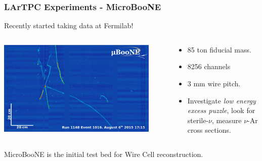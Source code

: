 \documentclass[xcolor=dvipsnames]{beamer}
\begin{document}
\begin{frame}
  \frametitle{LArTPC Experiments - MicroBooNE}

  \begin{center}
    Recently started taking data at Fermilab!    
  \end{center}

  \begin{columns}
    \begin{column}{0.5\textwidth}
      \begin{center}
        \includegraphics[width=0.9\textwidth]{run1148_ev1016.png}
      \end{center}

    \end{column}
    \begin{column}{0.5\textwidth}
      \begin{itemize}
      \item 85 ton fiducial mass.
      \item 8256 channels
      \item 3 mm wire pitch.
      \item Investigate \textit{low energy excess puzzle}, look for sterile-$\nu$, measure $\nu$-Ar
        cross sections.
      \end{itemize}
    \end{column}
  \end{columns}


  \begin{center}
    MicroBooNE is the initial test bed for Wire Cell reconstruction.    
  \end{center}

\end{frame}
\end{document}

